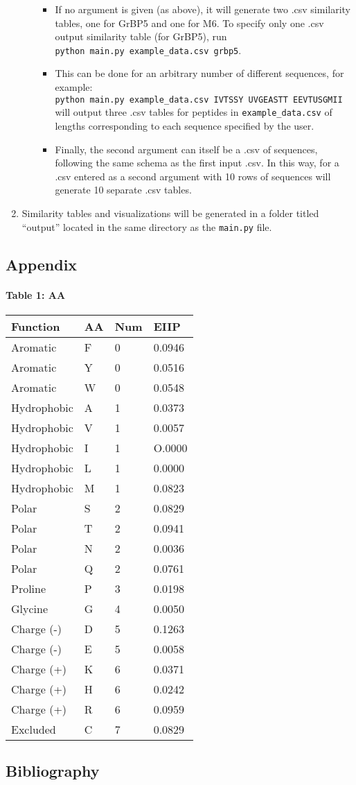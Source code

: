 \documentclass[]{article}
\let\oldparagraph\paragraph
\renewcommand{\paragraph}[1]{\oldparagraph{#1}\mbox{}}
\begin{document}
\begin{enumerate}
\begin{itemize}
    \begin{itemize}
    \item
      If no argument is given (as above), it will generate two .csv
      similarity tables, one for GrBP5 and one for M6. To specify only
      one .csv output similarity table (for GrBP5), run
      \texttt{python\ main.py\ example\_data.csv\ grbp5}.
    \item
      This can be done for an arbitrary number of different sequences,
      for example:
      \texttt{python\ main.py\ example\_data.csv\ IVTSSY\ UVGEASTT\ EEVTUSGMII}
      will output three .csv tables for peptides in
      \texttt{example\_data.csv} of lengths corresponding to each
      sequence specified by the user.
    \item
      Finally, the second argument can itself be a .csv of sequences,
      following the same schema as the first input .csv. In this way,
      for a .csv entered as a second argument with 10 rows of sequences
      will generate 10 separate .csv tables.
    \end{itemize}
  \end{itemize}
\item
  Similarity tables and visualizations will be generated in a folder
  titled ``output'' located in the same directory as the
  \texttt{main.py} file.
\end{enumerate}

\hypertarget{appendix}{%
\subsection{Appendix}\label{appendix}}

\hypertarget{table-1-aa}{%
\paragraph{Table 1: AA}\label{table-1-aa}}

\begin{longtable}[]{@{}llll@{}}
\toprule
Function & AA & Num & EIIP\tabularnewline
\midrule
\endhead
Aromatic & F & 0 & 0.0946\tabularnewline
Aromatic & Y & 0 & 0.0516\tabularnewline
Aromatic & W & 0 & 0.0548\tabularnewline
Hydrophobic & A & 1 & 0.0373\tabularnewline
Hydrophobic & V & 1 & 0.0057\tabularnewline
Hydrophobic & I & 1 & O.0000\tabularnewline
Hydrophobic & L & 1 & 0.0000\tabularnewline
Hydrophobic & M & 1 & 0.0823\tabularnewline
Polar & S & 2 & 0.0829\tabularnewline
Polar & T & 2 & 0.0941\tabularnewline
Polar & N & 2 & 0.0036\tabularnewline
Polar & Q & 2 & 0.0761\tabularnewline
Proline & P & 3 & 0.0198\tabularnewline
Glycine & G & 4 & 0.0050\tabularnewline
Charge (-) & D & 5 & 0.1263\tabularnewline
Charge (-) & E & 5 & 0.0058\tabularnewline
Charge (+) & K & 6 & 0.0371\tabularnewline
Charge (+) & H & 6 & 0.0242\tabularnewline
Charge (+) & R & 6 & 0.0959\tabularnewline
Excluded & C & 7 & 0.0829\tabularnewline
\bottomrule
\end{longtable}

\hypertarget{bibliography}{%
\subsection{Bibliography}\label{bibliography}}
\end{document}
